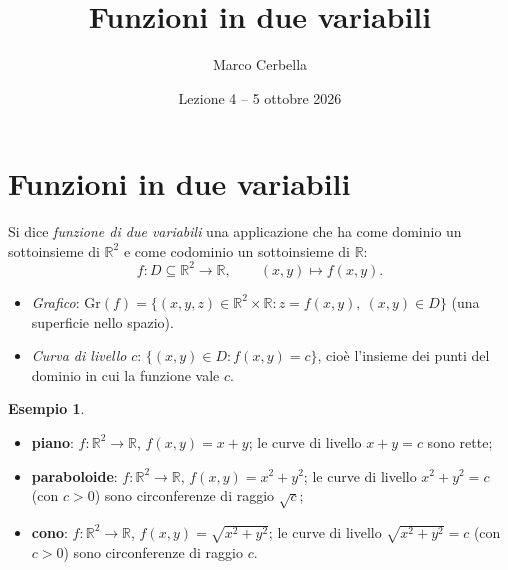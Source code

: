 \documentclass[11pt,a4paper]{article}
\title{Funzioni in due variabili}
\author{Marco Cerbella}
\date{Lezione 4 -- 5 ottobre 2026}
\theoremstyle{definition}
\newtheorem*{esempio}{Esempio}
\begin{document}
\maketitle

\section{Funzioni in due variabili}

\begin{definizione}
Si dice \emph{funzione di due variabili} una applicazione che ha come dominio un sottoinsieme di $\mathbb{R}^2$ e come codominio un sottoinsieme di $\mathbb{R}$:
\[
f : D \subseteq \mathbb{R}^2 \to \mathbb{R}, \qquad (x, y) \mapsto f(x, y).
\]
\end{definizione}

\begin{itemize}
    \item \emph{Grafico}: $\mathrm{Gr}(f) = \{(x, y, z) \in \mathbb{R}^2 \times \mathbb{R} : z = f(x, y),\ (x, y) \in D\}$ (una superficie nello spazio).
    \item \emph{Curva di livello} $c$: $\{(x, y) \in D : f(x, y) = c\}$, cioè l'insieme dei punti del dominio in cui la funzione vale $c$.
\end{itemize}

\begin{esempio}
\leavevmode
\begin{itemize}
    \item \textbf{piano}: $f : \mathbb{R}^2 \to \mathbb{R}$, $f(x, y) = x + y$; le curve di livello $x + y = c$ sono rette;
    \item \textbf{paraboloide}: $f : \mathbb{R}^2 \to \mathbb{R}$, $f(x, y) = x^2 + y^2$; le curve di livello $x^2 + y^2 = c$ (con $c > 0$) sono circonferenze di raggio $\sqrt c$;
    \item \textbf{cono}: $f : \mathbb{R}^2 \to \mathbb{R}$, $f(x, y) = \sqrt{x^2 + y^2}$; le curve di livello $\sqrt{x^2 + y^2} = c$ (con $c > 0$) sono circonferenze di raggio $c$.
\end{itemize}
\end{esempio}
\end{document}
